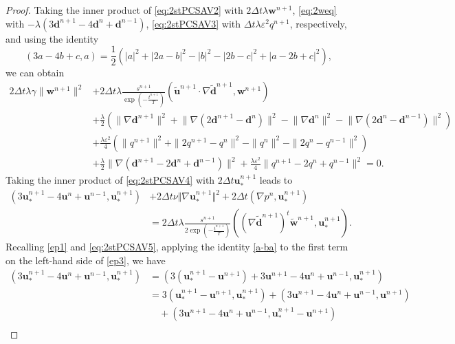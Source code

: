 \documentclass[12pt,reqno]{amsart}
\numberwithin{equation}{section}
\newcommand{\uu}{\mathrm{\textbf{u}}}
\newcommand{\dd}{\mathrm{\textbf{d}}}
\newcommand{\ww}{\mathrm{\textbf{w}}}
\begin{document}
\begin{proof}
Taking the inner product of \eqref{eq:2stPCSAV2} with $2\Delta t\lambda\ww^{n+1}$, \eqref{eq:2weq} with $-\lambda\left(3\dd^{n+1}-4\dd^{n}+\dd^{n-1}\right)$, \eqref{eq:2stPCSAV3} with $\Delta t\lambda\varepsilon^2q^{n+1}$, respectively, and using the identity 
\begin{equation}\label{ep1}
(3a-4b+c,a)=\frac{1}{2}\left(|a|^2+|2a-b|^2-|b|^2-|2b-c|^2+|a-2b+c|^2\right),
\end{equation}
we can obtain
{\small \begin{align}\label{ep2}%
2\Delta t\lambda\gamma\|\ww^{n+1}\|^2&+2\Delta t\lambda\frac{s^{n+1}}{\exp\left(-\frac{t^{n+1}}{T}\right)}\left(\tilde{\uu}^{n+1}\cdot\nabla \tilde{\dd}^{n+1},\ww^{n+1}\right)\\
&+\frac{\lambda}{2}\left(\lVert\nabla\dd^{n+1}\rVert^2+\lVert\nabla\left(2\dd^{n+1}-\dd^n\right)\rVert^2-\lVert\nabla\dd^{n}\rVert^2-\lVert\nabla\left(2\dd^{n}-\dd^{n-1}\right)\rVert^2
\right)\nonumber\\
&+\frac{\lambda\varepsilon^2}{4}\left(\|q^{n+1}\|^2+\|2q^{n+1}-q^n\|^2-\|q^{n}\|^2-\|2q^n-q^{n-1}\|^2\right)\nonumber\\
&+\frac{\lambda}{2}\lVert\nabla\left(\dd^{n+1}-2\dd^n+\dd^{n-1}\right)\rVert^2+\frac{\lambda\varepsilon^2}{4}\|q^{n+1}-2q^n+q^{n-1}\|^2=0.\nonumber
\end{align}}
Taking the inner product of \eqref{eq:2stPCSAV4} with $2\Delta t\uu_*^{n+1}$ leads to
\begin{align}\label{ep3}%
\left(3\uu_*^{n+1}-4\uu^{n}+\uu^{n-1},\uu_*^{n+1}\right)&+2\Delta t\nu\Vert \nabla\uu_*^{n+1}\Vert^2+2\Delta t\left(\nabla p^n,\uu_*^{n+1}\right)\\
&= 2\Delta t\lambda\frac{s^{n+1}}{2\exp\left(-\frac{t^{n+1}}{T}\right)}\left(\left(\nabla\tilde{\dd}^{n+1}\right)^t\tilde{\ww}^{n+1},\uu_*^{n+1}\right).\nonumber
\end{align}
Recalling \eqref{ep1} and \eqref{eq:2stPCSAV5}, applying the identity \eqref{a-ba} to the first term on the left-hand side of \eqref{ep3}, we have
{\begin{align}\label{ep32}
\left(3\uu_*^{n+1}-4\uu^{n}+\uu^{n-1},\uu_*^{n+1}\right)&=\left(3\left(\uu_*^{n+1}-\uu^{n+1}\right)+3\uu^{n+1}-4\uu^{n}+\uu^{n-1},\uu_*^{n+1}\right)\nonumber\\
&=3\left(\uu_*^{n+1}-\uu^{n+1},\uu_*^{n+1}\right)+
\left(3\uu^{n+1}-4\uu^{n}+\uu^{n-1},\uu^{n+1}\right)\nonumber\\
&\quad+\left(3\uu^{n+1}-4\uu^{n}+\uu^{n-1},\uu_*^{n+1}-\uu^{n+1}\right)\nonumber\\

\end{align}}
\end{proof}
\end{document}
